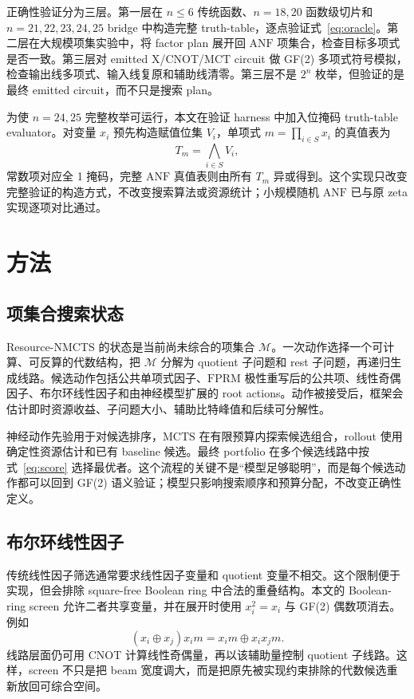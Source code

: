 \documentclass[UTF8,fontset=macnew,11pt]{ctexart}
\newcommand{\method}{Resource-NMCTS}
\newcommand{\anf}{\ensuremath{\mathrm{ANF}}}
\newcommand{\fprm}{\ensuremath{\mathrm{FPRM}}}
\newcommand{\mcts}{\ensuremath{\mathrm{MCTS}}}
\newcommand{\xor}{\ensuremath{\oplus}}
\newcommand{\mct}{\ensuremath{\mathrm{MCT}}}
\newcommand{\ttable}{truth-table}
\begin{document}
正确性验证分为三层。第一层在 $n\leq6$ 传统函数、$n=18,20$ 函数级切片和 $n=21,22,23,24,25$ bridge 中构造完整 \ttable{}，逐点验证式~\eqref{eq:oracle}。第二层在大规模项集实验中，将 factor plan 展开回 \anf{} 项集合，检查目标多项式是否一致。第三层对 emitted X/CNOT/\mct{} circuit 做 GF(2) 多项式符号模拟，检查输出线多项式、输入线复原和辅助线清零。第三层不是 $2^n$ 枚举，但验证的是最终 emitted circuit，而不只是搜索 plan。

为使 $n=24,25$ 完整枚举可运行，本文在验证 harness 中加入位掩码 truth-table evaluator。对变量 $x_i$ 预先构造赋值位集 $V_i$，单项式 $m=\prod_{i\in S}x_i$ 的真值表为
\begin{equation}
  T_m=\bigwedge_{i\in S}V_i ,
  \label{eq:truth-mask}
\end{equation}
常数项对应全 1 掩码，完整 \anf{} 真值表则由所有 $T_m$ 异或得到。这个实现只改变完整验证的构造方式，不改变搜索算法或资源统计；小规模随机 \anf{} 已与原 zeta 实现逐项对比通过。

\section{方法}

\subsection{项集合搜索状态}

\method{} 的状态是当前尚未综合的项集合 $\mathcal{M}$。一次动作选择一个可计算、可反算的代数结构，把 $\mathcal{M}$ 分解为 quotient 子问题和 rest 子问题，再递归生成线路。候选动作包括公共单项式因子、\fprm{} 极性重写后的公共项、线性奇偶因子、布尔环线性因子和由神经模型扩展的 root actions。动作被接受后，框架会估计即时资源收益、子问题大小、辅助比特峰值和后续可分解性。

神经动作先验用于对候选排序，\mcts{} 在有限预算内探索候选组合，rollout 使用确定性资源估计和已有 baseline 候选。最终 portfolio 在多个候选线路中按式~\eqref{eq:score} 选择最优者。这个流程的关键不是“模型足够聪明”，而是每个候选动作都可以回到 GF(2) 语义验证；模型只影响搜索顺序和预算分配，不改变正确性定义。

\subsection{布尔环线性因子}

传统线性因子筛选通常要求线性因子变量和 quotient 变量不相交。这个限制便于实现，但会排除 square-free Boolean ring 中合法的重叠结构。本文的 Boolean-ring screen 允许二者共享变量，并在展开时使用 $x_i^2=x_i$ 与 GF(2) 偶数项消去。例如
\begin{equation}
  (x_i\xor x_j)x_i m = x_i m \xor x_i x_j m .
  \label{eq:boolean-ring}
\end{equation}
线路层面仍可用 CNOT 计算线性奇偶量，再以该辅助量控制 quotient 子线路。这样，screen 不只是把 beam 宽度调大，而是把原先被实现约束排除的代数候选重新放回可综合空间。
\end{document}
